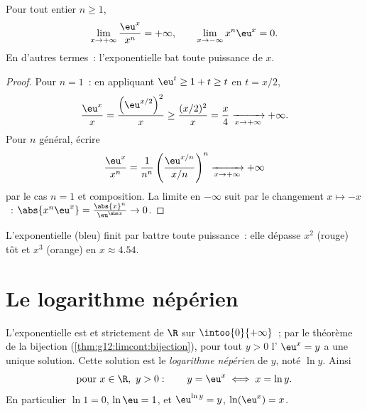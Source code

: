 \begin{theorem}\label{thm:g12:exp:growth}
Pour tout entier $n \geq 1$,
\[
\lim_{x\to+\infty} \frac{\eu^x}{x^n} = +\infty,
\qquad
\lim_{x\to-\infty} x^n \eu^x = 0 .
\]
En d'autres termes~: l'exponentielle bat toute puissance de $x$.
\end{theorem}

\begin{proof}
Pour $n = 1$~: en appliquant $\eu^t \geq 1 + t \geq t$ en $t = x/2$,
\[
\frac{\eu^x}{x} = \frac{\left(\eu^{x/2}\right)^2}{x}
\geq \frac{(x/2)^2}{x} = \frac{x}{4} \xrightarrow[x\to+\infty]{} +\infty .
\]
Pour $n$ général, écrire
\[
\frac{\eu^x}{x^n}
= \frac{1}{n^n}\left(\frac{\eu^{x/n}}{x/n}\right)^{n}
\xrightarrow[x\to+\infty]{} +\infty
\]
par le cas $n=1$ et composition. La limite en $-\infty$ suit par le
changement $x \mapsto -x$~:
$\abs{x^n \eu^x} = \frac{\abs{x}^n}{\eu^{\abs x}} \to 0$.
\end{proof}

\begin{omfigure}

{\small L'exponentielle (bleu) finit par battre toute puissance~: elle
dépasse $x^2$ (rouge) tôt et $x^3$ (orange) en $x \approx 4.54$.}
\end{omfigure}

\section{Le logarithme népérien}

\begin{definition}\label{def:g12:exp:ln}
L'exponentielle est  et strictement  de $\R$ sur
$\intoo{0}{+\infty}$~; par le théorème de la bijection
(\cref{thm:g12:limcont:bijection}), pour tout $y > 0$ l'
$\eu^x = y$ a une unique solution. Cette solution est le \emph{logarithme
népérien} de $y$, noté $\ln y$. Ainsi
\[
\text{pour } x \in \R,\ y > 0: \qquad y = \eu^x \iff x = \ln y .
\]
En particulier $\ln 1 = 0$, $\ln \eu = 1$, et
$\eu^{\ln y} = y$, $\ln(\eu^x) = x$.
\end{definition}

